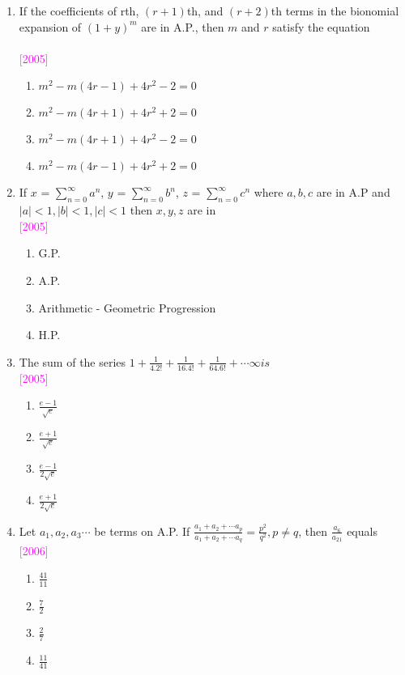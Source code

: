 \documentclass[journal,12pt,twocolumn]{IEEEtran}
\theoremstyle{remark}
\begin{document}
\begin{enumerate}[label=\textcolor{magenta}{\arabic*.}]
\item {If the coefficients of rth, $(r+1)$th, and $(r+2)$th terms in the bionomial expansion of $(1+y)^m$ are in A.P., then $m$ and $r$ satisfy the equation\\} \\ \textcolor {magenta}{\hfill{[2005]}} \\
\begin{enumerate}[label={(\alph*)}]
\item  {$m^2-m(4r-1)+4r^2-2=0$}
\item  {$m^2-m(4r+1)+4r^2+2=0$}
\item  {$m^2-m(4r+1)+4r^2-2=0$}
\item  {$m^2-m(4r-1)+4r^2+2=0$}
\end{enumerate}

\item {If $x$ = $\sum\limits_{n=0}^{\infty}a^n$, $y$ = $\sum\limits_{n=0}^{\infty}b^n$, $z$ = $\sum\limits_{n=0}^{\infty}c^n$ where $a,b,c$ are in A.P and $|a|<1,|b|<1,|c|<1$ then $x,y,z$ are in}\\ \textcolor {magenta}{\hfill{[2005]}} \\
\begin{enumerate}[label={(\alph*)}]
\item  {G.P.}
\item  {A.P.}
\item  {Arithmetic - Geometric Progression}
\item  {H.P.}
\end{enumerate}

\item {The sum of the series $1+\frac{1}{4.2!}+\frac{1}{16.4!}+\frac{1}{64.6!}+\cdots \infty is$}\\ \textcolor {magenta}{\hfill{[2005]}} \\
\begin{enumerate}[label={(\alph*)}]
\item  {$\frac{e-1}{\sqrt{e}}$}
\item  {$\frac{e+1}{\sqrt{e}}$}
\item  {$\frac{e-1}{2\sqrt{e}}$}
\item  {$\frac{e+1}{2\sqrt{e}}$}
\end{enumerate}

\item {Let $a_1, a_2, a_3 \cdots$ be terms on A.P. If $\frac{a_1+a_2+\cdots a_p}{a_1+a_2+\cdots a_q}= \frac{p^2}{q^2},p \neq q$, then $\frac{a_6}{a_{21}}$ equals}\\ \textcolor {magenta}{\hfill{[2006]}} \\
\begin{enumerate}[label={(\alph*)}]
\item  {$\frac{41}{11}$} \item  {$\frac{7}{2}$}
\item  {$\frac{2}{7}$} \item  {$\frac{11}{41}$}
\end{enumerate}




\end{enumerate}
\end{document}
